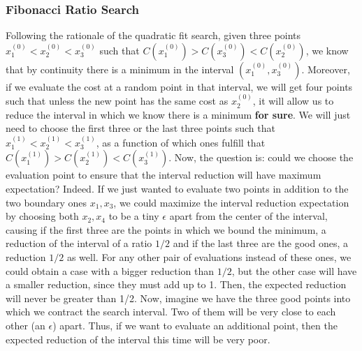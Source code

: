 \documentclass[11pt, a4paper, twoside]{article} %
\begin{document}
\vspace{-0.25cm}


\subsubsection*{Fibonacci Ratio Search}\vspace{-0.25cm}

Following the rationale of the quadratic fit search, given three points $x_1^{(0)}<x_2^{(0)}<x_3^{(0)}$ such that $C(x_1^{(0)})>C(x_3^{(0)})<C(x_2^{(0)})$, we know that by continuity there is a minimum in the interval $(x_1^{(0)},x_3^{(0)})$. Moreover, if we evaluate the cost at a random point in that interval, we will get four points such that unless the new point has the same cost as $x_2^{(0)}$, it will allow us to reduce the interval in which we know there is a minimum {\bf for sure}. We will just need to choose the first three or the last three points such that $x_1^{(1)}<x_2^{(1)}< x_3^{(1)}$, as a function of which ones fulfill that $C(x_1^{(1)})>C(x_2^{(1)})< C(x_3^{(1)})$. Now, the question is: could we choose the evaluation point to ensure that the interval reduction will have maximum expectation? Indeed. If we just wanted to evaluate two points in addition to the two boundary ones $x_1,x_3$, we could maximize the interval reduction expectation by choosing both $x_2,x_4$ to be a tiny $\epsilon$ apart from the center of the interval, causing if the first three are the points in which we bound the minimum, a reduction of the interval of a ratio $1/2$ and if the last three are the good ones, a reduction $1/2$ as well. For any other pair of evaluations instead of these ones, we could obtain a case with a bigger reduction than $1/2$, but the other case will have a smaller reduction, since they must add up to 1. Then, the expected reduction will never be greater than 1/2. Now, imagine we have the three good points into which we contract the search interval. Two of them will be very close to each other (an $\epsilon$) apart. Thus, if we want to evaluate an additional point, then the expected reduction of the interval this time will be very poor.
\end{document}
